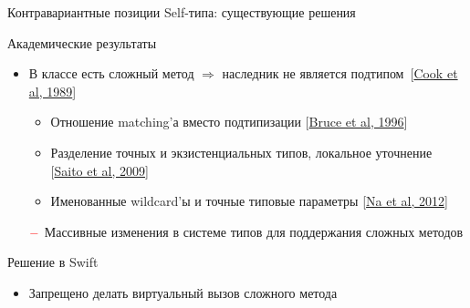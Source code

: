 \documentclass[usenames, dvipsnames]{beamer}
\begin{document}
\begin{frame}[fragile]{Контравариантные позиции Self-типа: существующие решения}
        \begin{block}{Академические результаты}
            \begin{itemize}
                \item В классе есть сложный метод $\Rightarrow$ наследник не является подтипом~[\href{https://dl.acm.org/doi/pdf/10.1145/96709.96721}{Cook et al, 1989}]
                \begin{itemize}
                    \item Отношение matching'а вместо подтипизации [\href{https://www.researchgate.net/profile/Kim-Bruce-2/publication/221496196_Subtyping_Is_Not_a_Good_Match_for_Object-Oriented_Languages/links/09e415122545c6d7a4000000/Subtyping-Is-Not-a-Good-Match-for-Object-Oriented-Languages.pdf}{Bruce et al, 1996}]
                    \item Разделение точных и экзистенциальных типов, локальное уточнение [\href{https://citeseerx.ist.psu.edu/document?repid=rep1&type=pdf&doi=a9d601d3bf8c921748902d58078d0a1b28f6ec4d}{Saito et al, 2009}]
                    \item Именованные wildcard'ы и точные типовые параметры [\href{https://www.researchgate.net/profile/Sukyoung-Ryu/publication/254004584_Exact_type_parameterization_and_ThisType_support/links/54b90ed10cf269d8cbf72d01/Exact-type-parameterization-and-ThisType-support.pdf}{Na et al, 2012}]
                \end{itemize}
                \item[$\color{red} -$] Массивные изменения в системе типов для поддержания сложных методов
            \end{itemize}
        \end{block}

        \begin{block}{Решение в Swift}
            \begin{itemize}
                \item Запрещено делать виртуальный вызов сложного метода
            \end{itemize}
        \end{block}
    \end{frame}
\end{document}
